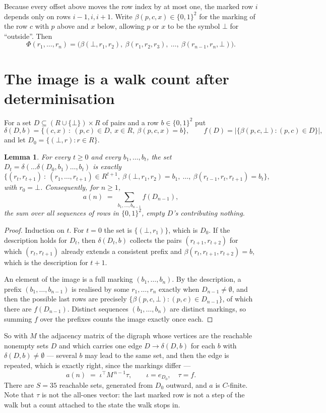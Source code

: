 \documentclass[11pt,a4paper]{article}
\theoremstyle{plain}
\newtheorem{lemma}[theorem]{Lemma}
\theoremstyle{definition}
\begin{document}
Because every offset above moves the row index by at most one, the marked row $i$ depends only
on rows $i-1,i,i+1$. Write $\beta(p,c,x)\in\{0,1\}^{2}$ for the marking of the row $c$
with $p$ above and $x$ below, allowing $p$ or $x$ to be the symbol $\bot$ for ``outside''.
Then
\[
\Phi(r_1,\dots,r_n)=\bigl(\beta(\bot,r_1,r_2),\ \beta(r_1,r_2,r_3),\ \dots,\
\beta(r_{n-1},r_n,\bot)\bigr).
\]

\section{The image is a walk count after determinisation}

For a set $D\subseteq(R\cup\{\bot\})\times R$ of pairs and a row $b\in\{0,1\}^{2}$ put
\[
\delta(D,b)=\{(c,x)\ :\ (p,c)\in D,\ x\in R,\ \beta(p,c,x)=b\},\qquad
f(D)=\bigl|\{\beta(p,c,\bot):(p,c)\in D\}\bigr| ,
\]
and let $D_0=\{(\bot,r):r\in R\}$.

\begin{lemma}\label{lem:det}
For every $t\ge0$ and every $b_1,\dots,b_t$, the set
$D_t=\delta(\dots\delta(D_0,b_1)\dots,b_t)$ is exactly
\[
\{(r_t,r_{t+1})\ :\ (r_1,\dots,r_{t+1})\in R^{t+1},\ \beta(\bot,r_1,r_2)=b_1,\ \dots,\
\beta(r_{t-1},r_t,r_{t+1})=b_t\} ,
\]
with $r_0=\bot$. Consequently, for $n\ge1$,
\[
a(n)\;=\;\sum_{b_1,\dots,b_{n-1}}f(D_{n-1}),
\]
the sum over all sequences of rows in $\{0,1\}^{2}$, empty $D$'s contributing nothing.
\end{lemma}

\begin{proof}
Induction on $t$. For $t=0$ the set is $\{(\bot,r_1)\}$, which is $D_0$. If the description
holds for $D_t$, then $\delta(D_t,b)$ collects the pairs $(r_{t+1},r_{t+2})$ for which
$(r_t,r_{t+1})$ already extends a consistent prefix and
$\beta(r_t,r_{t+1},r_{t+2})=b$, which is the description for $t+1$.

An element of the image is a full marking $(b_1,\dots,b_n)$. By the description, a prefix
$(b_1,\dots,b_{n-1})$ is realised by some $r_1,\dots,r_n$ exactly when $D_{n-1}\neq
\emptyset$, and then the possible last rows are precisely
$\{\beta(p,c,\bot):(p,c)\in D_{n-1}\}$, of which there are $f(D_{n-1})$. Distinct
sequences $(b_1,\dots,b_n)$ are distinct markings, so summing $f$ over the prefixes counts the
image exactly once each.
\end{proof}

So with $M$ the adjacency matrix of the digraph whose vertices are the reachable nonempty sets
$D$ and which carries one edge $D\to\delta(D,b)$ for each $b$ with $\delta(D,b)\neq\emptyset$
--- several $b$ may lead to the same set, and then the edge is repeated, which is exactly
right, since the markings differ ---
\[
a(n)\;=\;\iota^{\!\top}M^{\,n-1}\tau,\qquad \iota=e_{D_0},\quad \tau=f .
\]
There are $S=35$ reachable sets, generated from $D_0$ outward, and $a$ is $C$-finite. Note
that $\tau$ is not the all-ones vector: the last marked row is not a step of the walk but a
count attached to the state the walk stops in.
\end{document}
